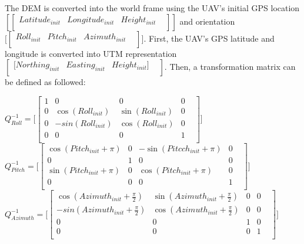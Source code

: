 The DEM is converted into the world frame using the UAV's initial GPS 
location$[\begin{bmatrix}
Latitude_{init} & Longitude_{init} & Height_{init} & \\
\end{bmatrix}
]$ and orientation$\lbrack \begin{bmatrix}
Roll_{init} & Pitch_{init } & Azimuth_{init} & \\
\end{bmatrix}
\rbrack $. First, the UAV's GPS latitude and longitude is converted 
into UTM representation$\begin{bmatrix}
[Northing_{init} & Easting_{init} & Height_{init}] & \\
\end{bmatrix}
$. Then, a transformation matrix can be defined as followed:

$Q_{Roll}^{-1}=\lbrack \begin{bmatrix}
1 & 0 & 0 & 0 & \\
0 & \cos (Roll_{init}) & \sin (Roll_{init}) & 0 & \\
0 & -sin(Roll_{init}) & \cos (Roll_{init}) & 0 & \\
0 & 0 & 0 & 1 & \\
\end{bmatrix}
\rbrack $\\


$Q_{Pitch}^{-1}=\lbrack \begin{bmatrix}
\cos (Pitch_{init}+\pi ) & 0 & -\sin (Pitcch_{init}+\pi ) & 0 & \\
0 & 1 & 0 & 0 & \\
\sin (Pitch_{init}+\pi ) & 0 & \cos (Pitch_{init}+\pi ) & 0 & \\
0 & 0 & 0 & 1 & \\
\end{bmatrix}
\rbrack $\\


$Q_{Azimuth}^{-1}=\lbrack \begin{bmatrix}
\cos (Azimuth_{init}+\frac{\pi }{2}) & \sin (Azimuth_{init}+\frac{\pi 
}{2}) & 0 & 0 & \\
-sin(Azimuth_{init}+\frac{\pi }{2}) & \cos (Azimuth_{init}+\frac{\pi 
}{2}) & 0 & 0 & \\
0 & 0 & 1 & 0 & \\
0 & 0 & 0 & 1 & \\
\end{bmatrix}
\rbrack $\\


